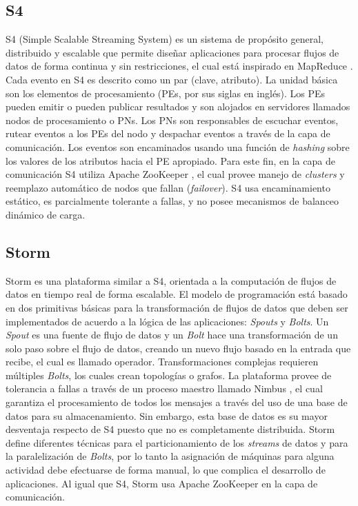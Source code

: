 \subsection{S4}
S4 (Simple Scalable Streaming System) \citep{s4yahoo} es un sistema de prop\'osito general, distribuido y escalable que permite dise\~nar aplicaciones para procesar flujos de datos de forma continua y sin restricciones, el cual est\'a inspirado en MapReduce \citep{2010Lin}. Cada evento en S4 es descrito como un par (clave, atributo). La unidad b\'asica son los elementos de procesamiento (PEs, por sus siglas en ingl\'es). Los PEs pueden emitir o pueden publicar resultados y son alojados en servidores llamados nodos de procesamiento o PNs. Los PNs son responsables de escuchar eventos, rutear eventos a los PEs del nodo y despachar eventos a trav\'es de la capa de comunicaci\'on. Los eventos son encaminados usando una funci\'on de \textsl{hashing} sobre los valores de los atributos hacia el PE apropiado. Para este fin, en la capa de comunicaci\'on S4 utiliza Apache ZooKeeper \citep{HuntKJR10}, el cual provee manejo de \textit{clusters} y reemplazo autom\'atico de nodos que fallan \normalsize{(\textit{failover})}. S4 usa encaminamiento est\'atico, es parcialmente tolerante a fallas, y no posee mecanismos de balanceo din\'amico de carga.

\subsection{Storm}
Storm \citep{bookstorm} es una plataforma similar a S4, orientada a la computaci\'on de flujos de datos en tiempo real de forma escalable. El modelo de programaci\'on est\'a basado en dos primitivas b\'asicas para la transformaci\'on de flujos de datos que deben ser implementados de acuerdo a la l\'ogica de las aplicaciones: \textit{Spouts} y \textit{Bolts}. Un \textit{Spout} es una fuente de flujo de datos y un \textit{Bolt} hace una transformaci\'on de un solo paso sobre el flujo de datos, creando un nuevo flujo basado en la entrada que recibe, el cual es llamado operador. Transformaciones complejas requieren m\'ultiples \textit{Bolts}, los cuales crean topolog\'ias o grafos. La plataforma provee de tolerancia a fallas a trav\'es de un proceso maestro llamado Nimbus \citep{MiaoYJ14}, el cual garantiza el procesamiento de todos los mensajes a trav\'es del uso de una base de datos para su almacenamiento. Sin embargo, esta base de datos es su mayor desventaja respecto de S4 puesto que no es completamente distribuida. Storm define diferentes t\'ecnicas para el particionamiento de los \textit{streams} de datos y para la paralelizaci\'on de \textit{Bolts}, por lo tanto la asignaci\'on de m\'aquinas para alguna actividad debe efectuarse de forma manual, lo que complica el desarrollo de aplicaciones. Al igual que S4, Storm usa Apache ZooKeeper \citep{HuntKJR10} en la capa de comunicaci\'on.

